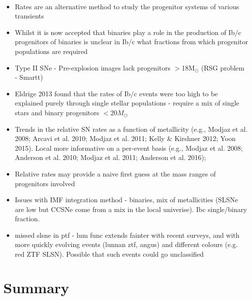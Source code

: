 \documentclass[a4paper,fleqn,usenatbib]{mnras}
\newcommand{\angus}[1]{\color{JungleGreen}#1\color{black}}
\begin{document}
{\angus{{\bf Angus to write some bullshit here} \\

{\begin{itemize}
    \item Rates are an alternative method to study the progenitor systems of various transients
    \item Whilst it is now accepted that binaries play a role in the production of Ib/c progenitors of binaries is unclear in Ib/c what fractions from which progenitor populations are required
    \item Type II SNe - Pre-explosion images lack progenitors $>$18M$_{\odot}$ (RSG problem - Smartt)
    \item Eldrige 2013 found that the rates of Ib/c events were too high to be explained purely through single stellar populations - require a mix of single  stars and binary progenitors $<20M_{\odot}$
    
    \item Trends in the relative SN rates as a function of metallicity (e.g., Modjaz et al. 2008; Arcavi et al. 2010; Modjaz et al. 2011; Kelly \& Kirshner 2012; Yoon 2015). Local more informative on a per-event basis (e.g., Modjaz et al. 2008; Anderson et al. 2010; Modjaz et al. 2011; Anderson et al. 2016); 
    
    \item Relative rates may provide a naive first guess at the mass ranges of progenitors involved
    \item Issues with IMF integration method - binaries, mix of metallicities (SLSNe are low but CCSNe come from a mix in the local univerise). Ibc single/binary fraction. 
    \item missed slsne in ptf - lum func extends fainter with recent surveys, and with more quickly evolving events (lunnan ztf, angus) and different colours (e.g. red ZTF SLSN). Possible that such events could go unclassified
\end{itemize}}

}}



\section{Summary}
\end{document}
